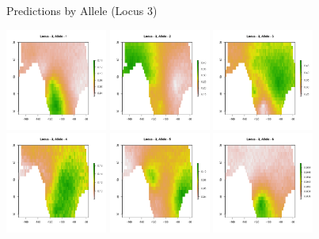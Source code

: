 \documentclass[11pt,ignorenonframetext,]{beamer}
\begin{document}
\begin{frame}{Predictions by Allele (Locus 3)}
\protect\hypertarget{predictions-by-allele-locus-3}{}

\begin{center}
\includegraphics[width=0.25\textwidth]{figs/allele3/Med-Al3-1.png}
\includegraphics[width=0.25\textwidth]{figs/allele3/Med-Al3-2.png}
\includegraphics[width=0.25\textwidth]{figs/allele3/Med-Al3-3.png} \\
\includegraphics[width=0.25\textwidth]{figs/allele3/Med-Al3-4.png}
\includegraphics[width=0.25\textwidth]{figs/allele3/Med-Al3-5.png}
\includegraphics[width=0.25\textwidth]{figs/allele3/Med-Al3-6.png} \\

\end{center}
\end{frame}
\end{document}
